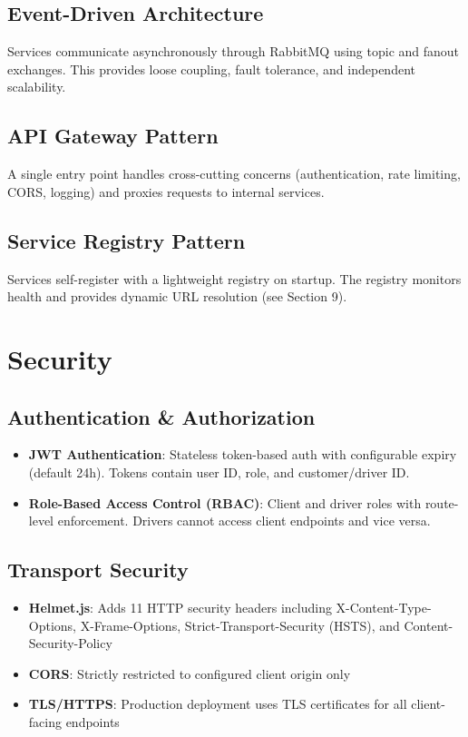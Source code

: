 \documentclass[12pt,a4paper]{article}
\begin{document}
\subsection{Event-Driven Architecture}
Services communicate asynchronously through RabbitMQ using topic and fanout exchanges. This provides loose coupling, fault tolerance, and independent scalability.

\subsection{API Gateway Pattern}
A single entry point handles cross-cutting concerns (authentication, rate limiting, CORS, logging) and proxies requests to internal services.

\subsection{Service Registry Pattern}
Services self-register with a lightweight registry on startup. The registry monitors health and provides dynamic URL resolution (see Section 9).

\section{Security}

\subsection{Authentication \& Authorization}

\begin{itemize}
  \item \textbf{JWT Authentication}: Stateless token-based auth with configurable expiry (default 24h). Tokens contain user ID, role, and customer/driver ID.
  \item \textbf{Role-Based Access Control (RBAC)}: Client and driver roles with route-level enforcement. Drivers cannot access client endpoints and vice versa.
\end{itemize}

\subsection{Transport Security}

\begin{itemize}
  \item \textbf{Helmet.js}: Adds 11 HTTP security headers including X-Content-Type-Options, X-Frame-Options, Strict-Transport-Security (HSTS), and Content-Security-Policy
  \item \textbf{CORS}: Strictly restricted to configured client origin only
  \item \textbf{TLS/HTTPS}: Production deployment uses TLS certificates for all client-facing endpoints
\end{itemize}
\end{document}
